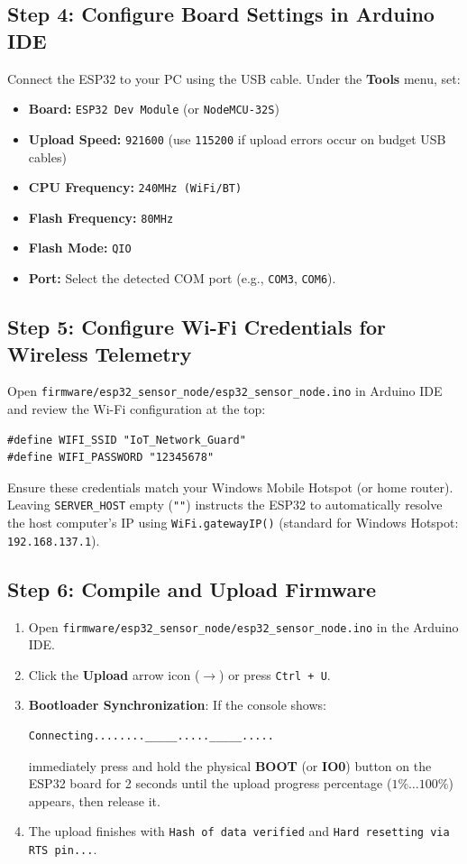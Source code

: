 \documentclass[11pt,a4paper]{article}
\begin{document}
\subsection{Step 4: Configure Board Settings in Arduino IDE}
Connect the ESP32 to your PC using the USB cable. Under the \textbf{Tools} menu, set:
\begin{itemize}[noitemsep]
    \item \textbf{Board:} \texttt{ESP32 Dev Module} (or \texttt{NodeMCU-32S})
    \item \textbf{Upload Speed:} \texttt{921600} (use \texttt{115200} if upload errors occur on budget USB cables)
    \item \textbf{CPU Frequency:} \texttt{240MHz (WiFi/BT)}
    \item \textbf{Flash Frequency:} \texttt{80MHz}
    \item \textbf{Flash Mode:} \texttt{QIO}
    \item \textbf{Port:} Select the detected COM port (e.g., \texttt{COM3}, \texttt{COM6}).
\end{itemize}

\subsection{Step 5: Configure Wi-Fi Credentials for Wireless Telemetry}
Open \texttt{firmware/esp32\_sensor\_node/esp32\_sensor\_node.ino} in Arduino IDE and review the Wi-Fi configuration at the top:
\begin{lstlisting}[numbers=none]
#define WIFI_SSID "IoT_Network_Guard"
#define WIFI_PASSWORD "12345678"
\end{lstlisting}
Ensure these credentials match your Windows Mobile Hotspot (or home router). Leaving \texttt{SERVER\_HOST} empty (\texttt{""}) instructs the ESP32 to automatically resolve the host computer's IP using \texttt{WiFi.gatewayIP()} (standard for Windows Hotspot: \texttt{192.168.137.1}).

\subsection{Step 6: Compile and Upload Firmware}
\begin{enumerate}
    \item Open \texttt{firmware/esp32\_sensor\_node/esp32\_sensor\_node.ino} in the Arduino IDE.
    \item Click the \textbf{Upload} arrow icon ($\rightarrow$) or press \texttt{Ctrl + U}.
    \item \textbf{Bootloader Synchronization}: If the console shows:
\begin{lstlisting}[numbers=none]
Connecting........_____....._____.....
\end{lstlisting}
    immediately press and hold the physical \textbf{BOOT} (or \textbf{IO0}) button on the ESP32 board for 2 seconds until the upload progress percentage ($1\% \dots 100\%$) appears, then release it.
    \item The upload finishes with \texttt{Hash of data verified} and \texttt{Hard resetting via RTS pin...}.
\end{enumerate}
\end{document}
